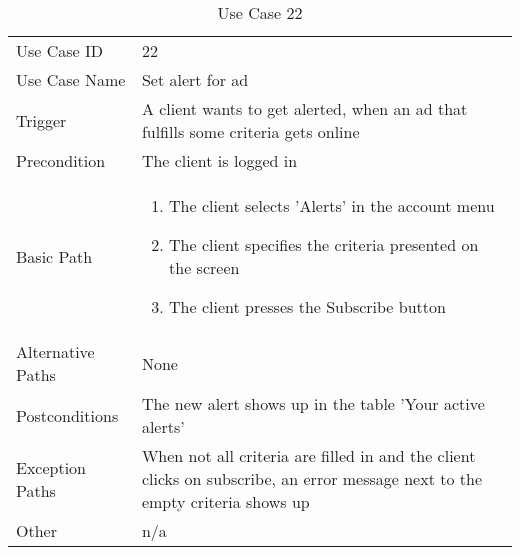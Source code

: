 \begin{table}[H]
\centering
\label{table-use-case-22}
\begin{tabular}{|p{3cm}|p{10cm}}
Use Case ID       & 22                                                           
\\
Use Case Name     & Set alert for ad                                                          
\\
Trigger           & A client wants to get alerted, when an ad that fulfills some
criteria gets online
\\
Precondition      & The client is logged in                                                 
\\
Basic Path        & \begin{enumerate}
\item The client selects 'Alerts' in the account menu
\item The client specifies the criteria presented on the screen
\item The client presses the Subscribe button
\end{enumerate} 
     \\
Alternative Paths & None                          \\
Postconditions    & The new alert shows up in the table 'Your active alerts'                                                          
\\
Exception Paths   & When not all criteria are filled in and the client clicks on
subscribe, an error message next to the empty criteria shows up
\\
Other             & n/a                                                                                                                                                                                                        
\end{tabular}
\caption{Use Case 22}
\end{table}

